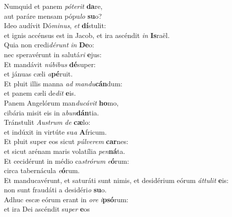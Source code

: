 \evenverse Numquid et panem \textit{pó}\textit{te}\textit{rit} \textbf{da}re,~\*\\
\evenverse aut paráre mensam pópu\textit{lo} \textbf{su}o?\\
\oddverse Ideo audívit Dó\textit{mi}\textit{nus}, \textit{et} \textbf{dí}stulit:~\*\\
\oddverse et ignis accénsus est in Jacob, et ira ascéndit \textit{in} \textbf{Is}raël.\\
\evenverse Quia non credi\textit{dé}\textit{runt} \textit{in} \textbf{De}o:~\*\\
\evenverse nec speravérunt in salutá\textit{ri} \textbf{e}jus:\\
\oddverse Et mandávit \textit{nú}\textit{bi}\textit{bus} \textbf{dé}super:~\*\\
\oddverse et jánuas cæli \textit{a}\textbf{pé}ruit.\\
\evenverse Et pluit illis manna \textit{ad} \textit{man}\textit{du}\textbf{cán}dum:~\*\\
\evenverse et panem cæli de\textit{dit} \textbf{e}is.\\
\oddverse Panem Angelórum man\textit{du}\textit{cá}\textit{vit} \textbf{ho}mo,~\*\\
\oddverse cibária misit eis in a\textit{bun}\textbf{dán}tia.\\
\evenverse Tránstulit \textit{Au}\textit{strum} \textit{de} \textbf{cæ}lo:~\*\\
\evenverse et indúxit in virtúte su\textit{a} \textbf{A}fricum.\\
\oddverse Et pluit super eos sicut \textit{púl}\textit{ve}\textit{rem} \textbf{car}nes:~\*\\
\oddverse et sicut arénam maris volatília \textit{pen}\textbf{ná}ta.\\
\evenverse Et cecidérunt in médio ca\textit{stró}\textit{rum} \textit{e}\textbf{ó}rum:~\*\\
\evenverse circa tabernácula \textit{e}\textbf{ó}rum.\\
\oddverse Et manducavérunt, et saturáti sunt nimis, et desidérium eórum \textit{át}\textit{tu}\textit{lit} \textbf{e}is:~\*\\
\oddverse non sunt fraudáti a desidéri\textit{o} \textbf{su}o.\\
\evenverse Adhuc escæ eórum erant in \textit{o}\textit{re} \textit{i}\textbf{psó}rum:~\*\\
\evenverse et ira Dei ascéndit su\textit{per} \textbf{e}os\\
